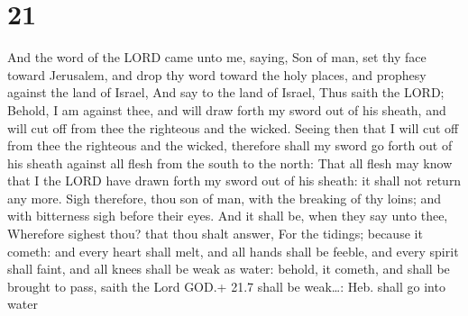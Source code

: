 \hypertarget{section-20}{%
\section{21}\label{section-20}}

 And the word of the LORD came unto me, saying, 
Son of man, set thy face toward Jerusalem, and drop thy word toward the
holy places, and prophesy against the land of Israel,  And
say to the land of Israel, Thus saith the LORD; Behold, I am against
thee, and will draw forth my sword out of his sheath, and will cut off
from thee the righteous and the wicked.  Seeing then that I
will cut off from thee the righteous and the wicked, therefore shall my
sword go forth out of his sheath against all flesh from the south to the
north:  That all flesh may know that I the LORD have drawn
forth my sword out of his sheath: it shall not return any more.
 Sigh therefore, thou son of man, with the breaking of thy
loins; and with bitterness sigh before their eyes.  And it
shall be, when they say unto thee, Wherefore sighest thou? that thou
shalt answer, For the tidings; because it cometh: and every heart shall
melt, and all hands shall be feeble, and every spirit shall faint, and
all knees shall be weak as water: behold, it cometh, and shall be
brought to pass, saith the Lord GOD.+ 21.7 shall be weak\ldots: Heb.
shall go into water

